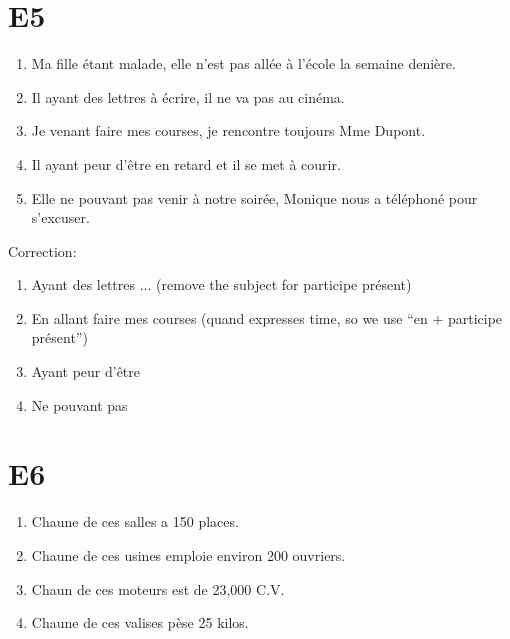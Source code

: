 \documentclass{book}
\begin{document}
    \section{E5}
        \begin{enumerate}
            \item Ma fille étant malade, elle n'est pas allée à l'école la semaine denière.
            \item Il ayant des lettres à écrire, il ne va pas au cinéma.
            \item Je venant faire mes courses, je rencontre toujours Mme Dupont.
            \item Il ayant peur d'être en retard et il se met à courir.
            \item Elle ne pouvant pas venir à notre soirée, Monique nous a téléphoné pour s'excuser.
        \end{enumerate}
        Correction:
        \begin{enumerate}
            \item Ayant des lettres ... (remove the subject for participe présent)
            \item En allant faire mes courses (quand expresses time, so we use ``en + participe présent'')
            \item Ayant peur d'être
            \item Ne pouvant pas 
        \end{enumerate}
    
    \section{E6}
        \begin{enumerate}
            \item Chaune de ces salles a 150 places.
            \item Chaune de ces usines emploie environ 200 ouvriers.
            \item Chaun de ces moteurs est de 23,000 C.V.
            \item Chaune de ces valises pèse 25 kilos.
        \end{enumerate}
\end{document}
